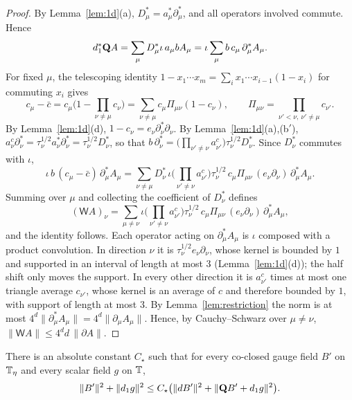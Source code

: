 \begin{proof}
By Lemma~\ref{lem:1d}(a), $D_\mu^*=a_\mu^*\partial_\mu^*$, and all operators involved commute. Hence
\[
d_1^*\mathbf Q A=\sum_\mu D_\mu^*\iota\,a_\mu bA_\mu=\iota\sum_\mu b\,c_\mu\,\partial_\mu^*A_\mu .
\]
For fixed $\mu$, the telescoping identity $1-x_1\cdots x_m=\sum_ix_1\cdots x_{i-1}(1-x_i)$ for commuting $x_i$ gives
\[
c_\mu-\bar c=c_\mu\Big(1-\prod_{\nu\ne\mu}c_\nu\Big)=\sum_{\nu\ne\mu}c_\mu\Pi_{\mu\nu}(1-c_\nu),\qquad\Pi_{\mu\nu}=\prod_{\nu'<\nu,\ \nu'\ne\mu}c_{\nu'} .
\]
By Lemma~\ref{lem:1d}(d), $1-c_\nu=e_\nu\partial_\nu^*\partial_\nu$. By Lemma~\ref{lem:1d}(a),(b$'$), $a^c_\nu\partial_\nu^*=\tau^{1/2}_\nu a_\nu^*\partial_\nu^*=\tau^{1/2}_\nu D_\nu^*$, so that $b\,\partial^*_\nu=\big(\prod_{\nu'\ne\nu}a^c_{\nu'}\big)\tau^{1/2}_\nu D^*_\nu$. Since $D^*_\nu$ commutes with $\iota$,
\[
\iota\,b\,(c_\mu-\bar c)\,\partial^*_\mu A_\mu=\sum_{\nu\ne\mu}D_\nu^*\,\iota\Big(\prod_{\nu'\ne\nu}a^c_{\nu'}\Big)\tau^{1/2}_\nu\,c_\mu\Pi_{\mu\nu}\,(e_\nu\partial_\nu)\,\partial^*_\mu A_\mu .
\]
Summing over $\mu$ and collecting the coefficient of $D^*_\nu$ defines
\[
(\mathsf WA)_\nu=\sum_{\mu\ne\nu}\iota\Big(\prod_{\nu'\ne\nu}a^c_{\nu'}\Big)\tau^{1/2}_\nu\,c_\mu\Pi_{\mu\nu}\,(e_\nu\partial_\nu)\,\partial^*_\mu A_\mu,
\]
and the identity follows. Each operator acting on $\partial^*_\mu A_\mu$ is $\iota$ composed with a product convolution. In direction $\nu$ it is $\tau^{1/2}_\nu e_\nu\partial_\nu$, whose kernel is bounded by $1$ and supported in an interval of length at most $3$ (Lemma~\ref{lem:1d}(d)); the half shift only moves the support. In every other direction it is $a^c_{\nu'}$ times at most one triangle average $c_{\nu'}$, whose kernel is an average of $c$ and therefore bounded by $1$, with support of length at most $3$. By Lemma~\ref{lem:restriction} the norm is at most $4^d\|\partial^*_\mu A_\mu\|=4^d\|\partial_\mu A_\mu\|$. Hence, by Cauchy--Schwarz over $\mu\ne\nu$, $\|\mathsf WA\|\le4^d d\,\|\partial A\|$.
\end{proof}

\begin{lemma}[Separation]\label{lem:separation}
There is an absolute constant $C_\star$ such that for every co-closed gauge field $B'$ on $\mathbb T_\eta$ and every scalar field $g$ on $\mathbb T$,
\[
\|B'\|^2+\|d_1 g\|^2\le C_\star\big(\|dB'\|^2+\|\mathbf Q B'+d_1 g\|^2\big).
\]
\end{lemma}

